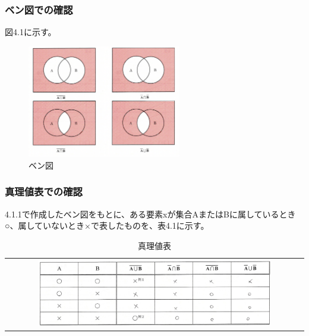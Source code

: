 \documentclass{jlreq}
\numberwithin{equation}{section}
\begin{document}
\subsubsection{ベン図での確認}
図4.1に示す。

\begin{figure}[H]
  \centering
  \includegraphics[width=0.6\textwidth]{assets/benzu.png}
  \caption{ベン図}
\end{figure}

\subsubsection{真理値表での確認}
4.1.1で作成したベン図をもとに、ある要素xが集合AまたはBに属しているとき○、属していないとき×で表したものを、表4.1に示す。

\begin{table}[H]
  \centering
  \caption{真理値表}
  \begin{tabular}{c}
    \includegraphics[width=0.8\textwidth]{assets/domoshinri.png} \\
  \end{tabular}
\end{table}
\end{document}
